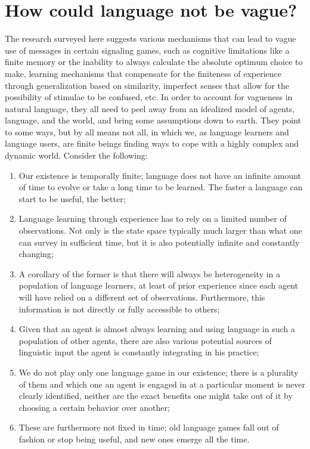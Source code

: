 \documentclass[a4paper]{article}
\begin{document}
\section{How could language not be vague?}
\label{sec:finite-experience}
The research surveyed here suggests various mechanisms that can lead to vague use of messages in certain signaling games, such as cognitive limitations like a finite memory or the inability to always calculate the absolute optimum choice to make, learning mechanisms that compensate for the finiteness of experience through generalization based on similarity, imperfect senses that allow for the possibility of stimulae to be confused, etc.
In order to account for vagueness in natural language, they all need to peel away from an idealized model of agents, language, and the world, and bring some assumptions down to earth.
They point to some ways, but by all means not all, in which we, as language learners and language users, are finite beings finding ways to cope with a highly complex and dynamic world.
Consider the following:
\begin{enumerate}
\item Our existence is temporally finite; language does not have an infinite amount of time to evolve or take a long time to be learned. The faster a language can start to be useful, the better;
\item Language learning through experience has to rely on a limited number of observations. Not only is the state space typically much larger than what one can survey in sufficient time, but it is also potentially infinite and constantly changing;
\item A corollary of the former is that there will always be heterogeneity in a population of language learners, at least of prior experience since each agent will have relied on a different set of observations. Furthermore, this information is not directly or fully accessible to others;
\item Given that an agent is almost always learning and using language in such a population of other agents, there are also various potential sources of linguistic input the agent is constantly integrating in his practice;
\item We do not play only one language game in our existence; there is a plurality of them and which one an agent is engaged in at a particular moment is never clearly identified, neither are the exact benefits one might take out of it by choosing a certain behavior over another;
\item These are furthermore not fixed in time; old language games fall out of fashion or stop being useful, and new ones emerge all the time.
\end{enumerate}
\end{document}
